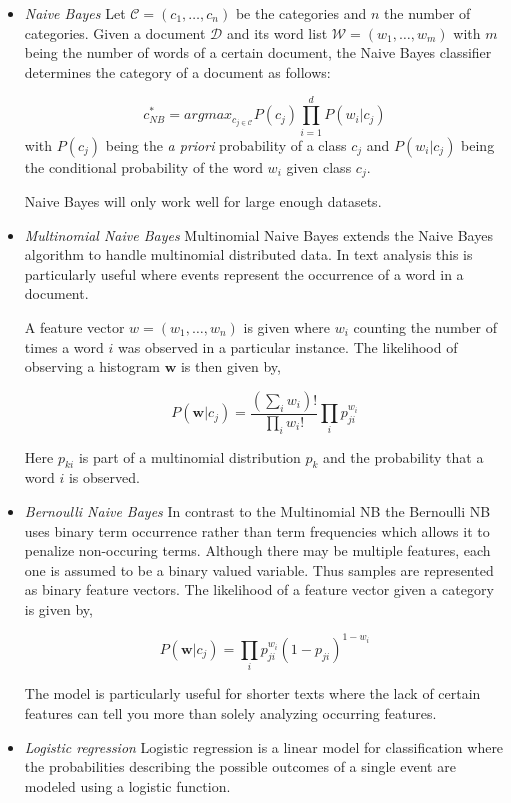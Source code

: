 \documentclass[a4paper,12pt]{article}
\begin{document}
\begin{itemize}
\item \textit{Naive Bayes} Let $\mathcal{C} = (c_1,\dots,c_n)$ be the categories and $n$ the number of categories. Given a document $\mathcal{D}$ and its word list $\mathcal{W} = (w_1, \dots, w_m)$ with $m$ being the number of words of a certain document, the Naive Bayes classifier determines the category of a document as follows:

$$
c^*_{NB} = argmax_{c_{j \in \mathcal{C}}} P(c_j) \prod^d_{i = 1} P(w_i | c_j)
$$
with $P(c_j)$ being the \textit{a priori} probability of a class $c_j$ and $P(w_i | c_j)$ being the conditional probability of the word $w_i$ given class $c_j$.

Naive Bayes will only work well for large enough datasets. 

\item \textit{Multinomial Naive Bayes}
Multinomial Naive Bayes extends the Naive Bayes algorithm to handle multinomial distributed data. In text analysis this is particularly useful where events represent the occurrence of a word in a document. 

A feature vector $w = (w_1, \dots, w_n)$ is given where $w_i$ counting the number of times a word $i$ was observed in a particular instance. The likelihood of observing a histogram $\mathbf{w}$ is then given by,

$$
 P(\mathbf{w}| c_j) = \frac{(\sum_{i}{w_i})!}{\prod_{i} w_i!}\prod_{i}p^{w_i}_{ji}

$$

Here $p_{ki}$ is part of a multinomial distribution $p_{k}$ and the probability that a word $i$ is observed.

\item \textit{Bernoulli Naive Bayes}
In contrast to the Multinomial NB the Bernoulli NB uses binary term occurrence rather than term frequencies which allows it to penalize non-occuring terms. Although there may be multiple features, each one is assumed to be a binary valued variable. Thus samples are represented as binary feature vectors. The likelihood of a feature vector given a category is given by,

$$
 P(\mathbf{w}| c_j) =\prod_{i} p^{w_i}_{ji}(1-p_{ji})^{1-w_i}

$$


The model is particularly useful for shorter texts where the lack of certain features can tell you more than solely analyzing occurring features. 

\item \textit{Logistic regression}
Logistic regression is a linear model for classification where the probabilities describing the possible outcomes of a single event are modeled using a logistic function.


\end{itemize}
\end{document}
